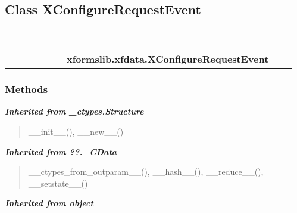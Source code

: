 \subsection{Class XConfigureRequestEvent}

    \label{xformslib:xfdata:XConfigureRequestEvent}
\begin{tabular}{cccccccccc}
\multicolumn{2}{r}{\settowidth{\BCL}{object}\multirow{2}{\BCL}{object}}
&&
&&
&&
  \\\cline{3-3}
  &&\multicolumn{1}{c|}{}
&&
&&
&&
  \\
\multicolumn{4}{r}{\settowidth{\BCL}{??.\_CData}\multirow{2}{\BCL}{??.\_CData}}
&&
&&
  \\\cline{5-5}
  &&&&\multicolumn{1}{c|}{}
&&
&&
  \\
\multicolumn{6}{r}{\settowidth{\BCL}{\_ctypes.Structure}\multirow{2}{\BCL}{\_ctypes.Structure}}
&&
  \\\cline{7-7}
  &&&&&&\multicolumn{1}{c|}{}
&&
  \\
&&&&&&\multicolumn{2}{l}{\textbf{xformslib.xfdata.XConfigureRequestEvent}}
\end{tabular}



  \subsubsection{Methods}


\large{\textbf{\textit{Inherited from \_ctypes.Structure}}}

\begin{quote}
\_\_init\_\_(), \_\_new\_\_()
\end{quote}

\large{\textbf{\textit{Inherited from ??.\_CData}}}

\begin{quote}
\_\_ctypes\_from\_outparam\_\_(), \_\_hash\_\_(), \_\_reduce\_\_(), \_\_setstate\_\_()
\end{quote}

\large{\textbf{\textit{Inherited from object}}}

